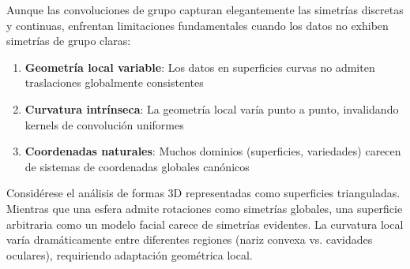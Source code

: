 Aunque las convoluciones de grupo capturan elegantemente las simetrías discretas y continuas, enfrentan limitaciones fundamentales cuando los datos no exhiben simetrías de grupo claras:

\begin{enumerate}
    \item \textbf{Geometría local variable}: Los datos en superficies curvas no admiten traslaciones globalmente consistentes
    \item \textbf{Curvatura intrínseca}: La geometría local varía punto a punto, invalidando kernels de convolución uniformes
    \item \textbf{Coordenadas naturales}: Muchos dominios (superficies, variedades) carecen de sistemas de coordenadas globales canónicos
\end{enumerate}

\begin{example}
Considérese el análisis de formas 3D representadas como superficies trianguladas. Mientras que una esfera admite rotaciones como simetrías globales, una superficie arbitraria como un modelo facial carece de simetrías evidentes. La curvatura local varía dramáticamente entre diferentes regiones (nariz convexa vs. cavidades oculares), requiriendo adaptación geométrica local.
\end{example}

